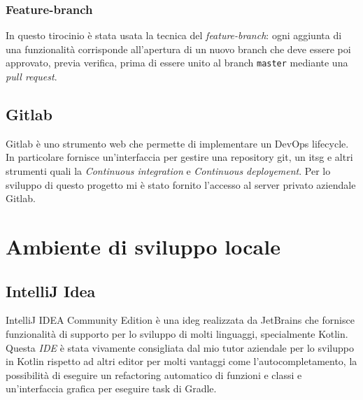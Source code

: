 \subsubsection*{Feature-branch}
In questo tirocinio è stata usata la tecnica del \emph{feature-branch}: ogni aggiunta di una funzionalità corrisponde all'apertura di un nuovo branch che deve essere poi approvato, previa verifica, prima di essere unito al branch \verb|master| mediante una \emph{pull request}.

\subsection{Gitlab}
Gitlab è uno strumento web che permette di implementare un DevOps lifecycle. In particolare fornisce un'interfaccia per gestire una repository git, un \gls{itsg} e altri strumenti quali la \emph{Continuous integration} e \emph{Continuous deployement}. Per lo sviluppo di questo progetto mi è stato fornito l'accesso al server privato aziendale Gitlab.

\section{Ambiente di sviluppo locale}
\subsection{IntelliJ Idea}
IntelliJ IDEA Community Edition è una \gls{ideg} realizzata da JetBrains che fornisce funzionalità di supporto per lo sviluppo di molti linguaggi, specialmente Kotlin. Questa \emph{IDE} è stata vivamente consigliata dal mio tutor aziendale per lo sviluppo in Kotlin rispetto ad altri editor per molti vantaggi come l'autocompletamento, la possibilità di eseguire un refactoring automatico di funzioni e classi e un'interfaccia grafica per eseguire task di Gradle.
 

